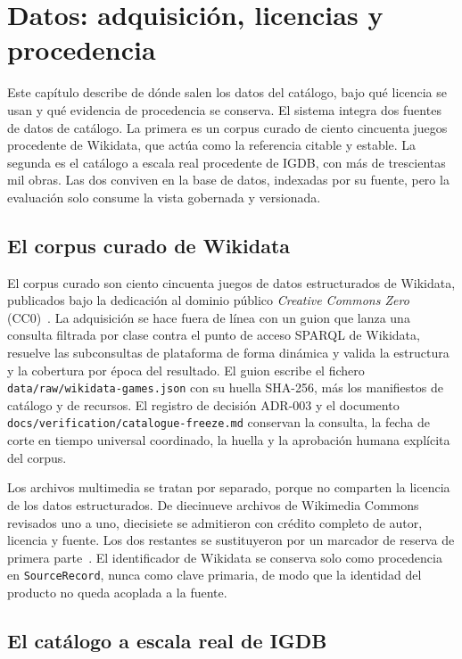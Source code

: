 \chapter{Datos: adquisición, licencias y procedencia}\label{cap:datos}

Este capítulo describe de dónde salen los datos del catálogo, bajo qué licencia se usan y qué
evidencia de procedencia se conserva. El sistema integra dos fuentes de datos de catálogo. La
primera es un corpus curado de ciento cincuenta juegos procedente de Wikidata, que actúa como
la referencia citable y estable. La segunda es el catálogo a escala real procedente de IGDB,
con más de trescientas mil obras. Las dos conviven en la base de datos, indexadas por su
fuente, pero la evaluación solo consume la vista gobernada y versionada.

\section{El corpus curado de Wikidata}\label{sec:datos-wikidata}

El corpus curado son ciento cincuenta juegos de datos estructurados de Wikidata,
publicados bajo la dedicación al dominio público \textit{Creative Commons Zero}
(CC0)~\cite{wikidata-licensing}. La adquisición se hace fuera de línea con un guion que
lanza una consulta filtrada por clase contra el punto de acceso SPARQL de Wikidata, resuelve
las subconsultas de plataforma de forma dinámica y valida la estructura y la cobertura por
época del resultado. El guion escribe el fichero \texttt{data/raw/wikidata-games.json} con su
huella SHA-256, más los manifiestos de catálogo y de recursos. El registro de decisión
ADR-003 y el documento \texttt{docs/verification/catalogue-freeze.md} conservan la consulta,
la fecha de corte en tiempo universal coordinado, la huella y la aprobación humana explícita
del corpus.

Los archivos multimedia se tratan por separado, porque no comparten la licencia de los datos
estructurados. De diecinueve archivos de Wikimedia Commons revisados uno a uno, diecisiete se
admitieron con crédito completo de autor, licencia y fuente. Los dos restantes se
sustituyeron por un marcador de reserva de primera parte~\cite{commons-reuse}. El identificador de Wikidata se
conserva solo como procedencia en \texttt{SourceRecord}, nunca como clave primaria, de modo
que la identidad del producto no queda acoplada a la fuente.

\section{El catálogo a escala real de IGDB}\label{sec:datos-igdb}

